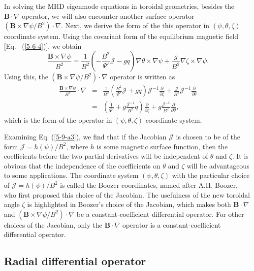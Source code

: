 \documentclass{article}
\begin{document}
In solving the MHD eigenmode equations in toroidal geometries, besides the
$\mathbf{B} \cdot \nabla$ operator, we will also encounter another surface
operator $(\mathbf{B} \times \nabla \psi / B^2) \cdot \nabla$. Next, we derive
the form of the this operator in $(\psi, \theta, \zeta)$ coordinate system.
Using the covariant form of the equilibrium magnetic field [Eq. \
(\ref{5-6-4})], we obtain
\begin{equation}
  \label{5-6-7} \frac{\mathbf{B} \times \nabla \psi}{B^2} = \frac{1}{B^2}
  \left( - \frac{B^2}{\Psi'} \mathcal{J}- g q \right) \nabla \theta \times
  \nabla \psi + \frac{g}{B^2} \nabla \zeta \times \nabla \psi .
\end{equation}
Using this, the $(\mathbf{B} \times \nabla \psi / B^2) \cdot \nabla$ operator
is written as
\begin{eqnarray}
  \frac{\mathbf{B} \times \nabla \psi}{B^2} \cdot \nabla & = & \frac{1}{B^2}
  \left( \frac{B^2}{\Psi'} \mathcal{J}+ g q \right) \mathcal{J}^{- 1}
  \frac{\partial}{\partial \zeta} + \frac{g}{B^2} \mathcal{J}^{- 1}
  \frac{\partial}{\partial \theta} \\
  & = & \left( \frac{1}{\Psi'} + g \frac{\mathcal{J}^{- 1}}{B^2} q \right)
  \frac{\partial}{\partial \zeta} + g \frac{\mathcal{J}^{- 1}}{B^2} 
  \frac{\partial}{\partial \theta},  \label{5-9-a3}
\end{eqnarray}
which is the form of the operator in $(\psi, \theta, \zeta)$ coordinate
system.

Examining Eq. (\ref{5-9-a3}), we find that if the Jacobian $\mathcal{J}$ is
chosen to be of the form $\mathcal{J}= h (\psi) / B^2$, where $h$ is some
magnetic surface function, then the coefficients before the two partial
derivatives will be independent of $\theta$ and $\zeta$. It is obvious that
the independence of the coefficients on $\theta$ and $\zeta$ will be
advantageous to some applications. The coordinate system $(\psi, \theta,
\zeta)$ with the particular choice of $\mathcal{J}= h (\psi) / B^2$ is called
the Boozer coordinates, named after A.H. Boozer, who first proposed this
choice of the Jacobian. The usefulness of the new toroidal angle $\zeta$ is
highlighted in Boozer's choice of the Jacobian, which makes both $\mathbf{B}
\cdot \nabla$ and $(\mathbf{B} \times \nabla \psi / B^2) \cdot \nabla$ be a
constant-coefficient differential operator. For other choices of the Jacobian,
only the $\mathbf{B} \cdot \nabla$ operator is a constant-coefficient
differential operator.

\subsection{Radial differential operator}
\end{document}

